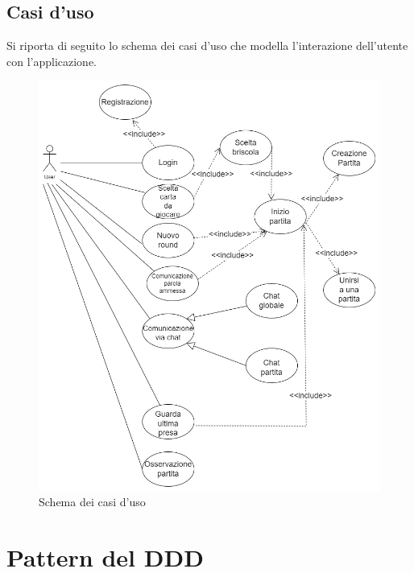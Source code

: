 \subsection{Casi d'uso}
Si riporta di seguito lo schema dei casi d'uso che modella l'interazione dell'utente con l'applicazione.
\begin{figure}[h!]
\centering 
\includegraphics[scale=0.45]{report/img/Casi_duso.png}
\caption{Schema dei casi d'uso}
\label{use_case}
\end{figure}

\section{Pattern del DDD}

